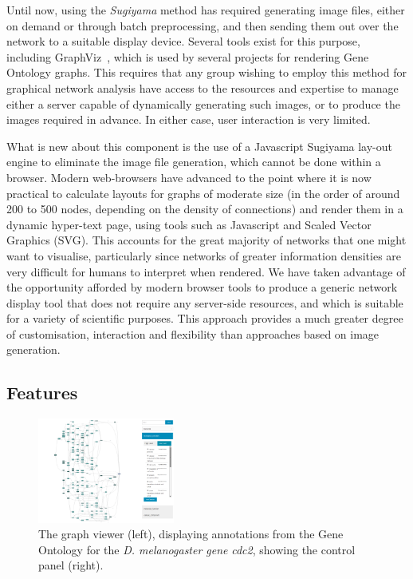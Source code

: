 \documentclass[10pt,a4paper,twocolumn]{article}
\begin{document}
Until now, using the \emph{Sugiyama} method has required generating image files,
either on demand or through batch preprocessing, and then sending them out over
the network to a suitable display device. Several tools exist for this purpose,
including GraphViz~\cite{graphviz}, which is used by several projects for
rendering Gene Ontology graphs. This requires that any group wishing to employ
this method for graphical network analysis have access to the resources and
expertise to manage either a server capable of dynamically generating such
images, or to produce the images required in advance. In either case, user
interaction is very limited.

What is new about this component is the use of a Javascript Sugiyama lay-out
engine to eliminate the image file generation, which cannot be done within a
browser.  Modern web-browsers have advanced to the point where it is now
practical to calculate layouts for graphs of moderate size (in the order of
around 200 to 500 nodes, depending on the density of connections) and render
them in a dynamic hyper-text page, using tools such as Javascript and Scaled
Vector Graphics (SVG). This accounts for the great majority of networks that one
might want to visualise, particularly since networks of greater information
densities are very difficult for humans to interpret when rendered. We have
taken advantage of the opportunity afforded by modern browser tools to produce a
generic network display tool that does not require any server-side resources,
and which is suitable for a variety of scientific purposes. This approach
provides a much greater degree of customisation, interaction and flexibility
than approaches based on image generation.

\subsection*{Features}

\begin{figure}[htb]
\centering
\includegraphics[width=0.4\textwidth]{dagify.png}
\caption{
    \label{fig:1}
    The graph viewer (left), displaying annotations from the Gene Ontology for
    the \textit{D. melanogaster gene} \emph{cdc2}, showing the control panel (right).
}
\end{figure}
\end{document}
